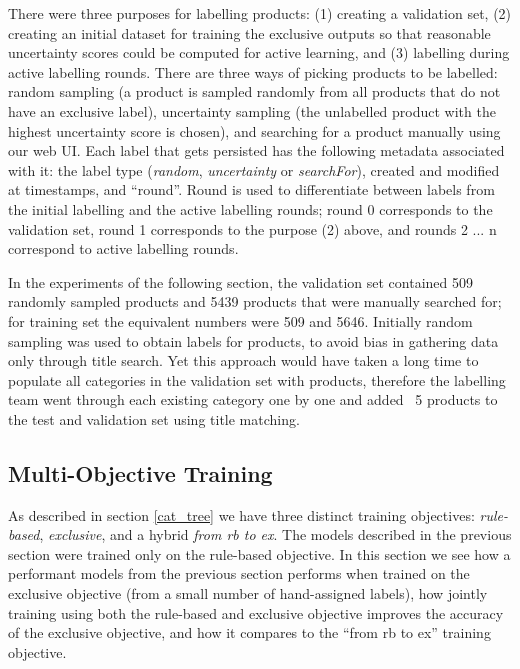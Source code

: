 There were three purposes for labelling products: (1) creating a validation set, (2) creating an initial dataset for training the exclusive outputs so that reasonable uncertainty scores could be computed for active learning, and (3) labelling during active labelling rounds.
There are three ways of picking products to be labelled: random sampling (a product is sampled randomly from all products that do not have an exclusive label), uncertainty sampling (the unlabelled product with the highest uncertainty score is chosen), and searching for a product manually using our web UI.
Each label that gets persisted has the following metadata associated with it: the label type (\textit{random}, \textit{uncertainty} or \textit{searchFor}), created and modified at timestamps, and ``round''.
Round is used to differentiate between labels from the initial labelling and the active labelling rounds; round 0 corresponds to the validation set, round 1 corresponds to the purpose (2) above, and rounds 2 ... n correspond to active labelling rounds.

In the experiments of the following section, the validation set contained 509 randomly sampled products and 5439 products that were manually searched for; for training set the equivalent numbers were 509 and 5646.
Initially random sampling was used to obtain labels for products, to avoid bias in gathering data only through title search.
Yet this approach would have taken a long time to populate all categories in the validation set with products, therefore the labelling team went through each existing category one by one and added ~5 products to the test and validation set using title matching.

\subsection{Multi-Objective Training}
\label{multiobj}

As described in section \ref{cat_tree} we have three distinct training objectives: \textit{rule-based}, \textit{exclusive}, and a hybrid \textit{from rb to ex}.
The models described in the previous section were trained only on the rule-based objective.
In this section we see how a performant models from the previous section performs when trained on the exclusive objective (from a small number of hand-assigned labels), how jointly training using both the rule-based and exclusive objective improves the accuracy of the exclusive objective, and how it compares to the ``from rb to ex'' training objective.

